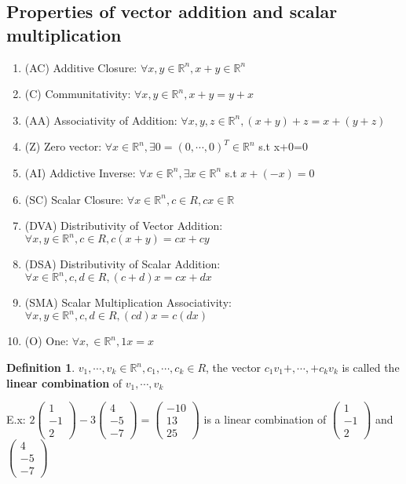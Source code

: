 \documentclass{article}
\theoremstyle{definition}
\newtheorem{definition}{Definition}[section]
\theoremstyle{thrm}
\begin{document}
\subsection{Properties of vector addition and scalar multiplication}
\begin{enumerate}
	\item (AC) Additive Closure: $\forall x, y \in \mathbb{R}^n, x+y \in \mathbb{R}^n$
	\item (C) Communitativity: $\forall x,y \in \mathbb{R}^n, x+y = y+x$
	\item (AA) Associativity of Addition: $\forall x,y ,z\in \mathbb{R}^n, (x+y)+z = x + (y+z)$
	\item (Z) Zero vector: $\forall x \in \mathbb{R}^n, \exists 0 = (0,\cdots,0)^T \in \mathbb{R}^n$ s.t x+0=0
	\item (AI) Addictive Inverse: $\forall x\in \mathbb{R}^n, \exists x \in \mathbb{R}^n$ s.t $x + (-x) = 0$
	\item (SC) Scalar Closure: $\forall x\in \mathbb{R}^n, c \in R, cx \in \mathbb{R}$
	\item (DVA) Distributivity of Vector Addition: $\forall x,y \in \mathbb{R}^n, c \in R, c(x+y) = cx+cy $
	\item (DSA) Distributivity of Scalar Addition: $\forall x\in \mathbb{R}^n, c,d \in R, (c+d)x = cx+dx $
	\item (SMA) Scalar Multiplication Associativity: $\forall x,y \in \mathbb{R}^n, c,d \in R, (cd)x = c(dx)$
	\item (O) One: $\forall x,\in \mathbb{R}^n, 1x=x$
\end{enumerate}
\begin{definition}
	$v_1, \cdots, v_k \in \mathbb{R}^n, c_1,\cdots, c_k \in R$, the vector $c_1v_1+,\cdots, +c_kv_k$ is called the \textbf{linear combination} of $v_1,\cdots, v_k$
\end{definition}
E.x: $2\begin{pmatrix}
	1\\-1\\2
\end{pmatrix} - 3\begin{pmatrix}
	4\\-5\\-7
\end{pmatrix} = \begin{pmatrix}
	-10\\13\\25
\end{pmatrix}$ is a linear combination of $\begin{pmatrix}
	1\\-1\\2
\end{pmatrix} $ and $\begin{pmatrix}
	4\\-5\\-7
\end{pmatrix}$
\end{document}
